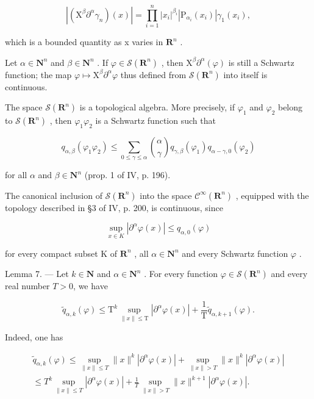\[
| (\mathrm{X} ^ {\beta} \partial^ {\alpha} \gamma_ {n}) (x) | = \prod_ {i = 1} ^ {n} | x _ {i} | ^ {\beta_ {i}} | \mathrm{P} _ {\alpha_ {i}} (x _ {i}) | \gamma_ {1} (x _ {i}),
\]

which is a bounded quantity as x varies in \(\mathbf{R}^{n}\) .

Let \(\alpha \in \mathbf{N}^n\) and \(\beta \in \mathbf{N}^n\) . If \(\varphi \in \mathcal{S}(\mathbf{R}^n)\) , then \(\mathrm{X}^{\beta}\partial^{\alpha}(\varphi)\) is still a Schwartz function; the map \(\varphi \mapsto \mathrm{X}^{\beta}\partial^{\alpha}\varphi\) thus defined from \(\mathcal{S}(\mathbf{R}^n)\) into itself is continuous.

The space \(\mathcal{S}(\mathbf{R}^{n})\) is a topological algebra. More precisely, if \(\varphi_{1}\) and \(\varphi_{2}\) belong to \(\mathcal{S}(\mathbf{R}^{n})\) , then \(\varphi_{1}\varphi_{2}\) is a Schwartz function such that

\[
q _ {\alpha , \beta} (\varphi_ {1} \varphi_ {2}) \leqslant \sum_ {0 \leqslant \gamma \leqslant \alpha} \binom{\alpha}{\gamma} q _ {\gamma , \beta} (\varphi_ {1}) q _ {\alpha - \gamma , 0} (\varphi_ {2})\tag{2}
\]

for all \(\alpha\) and \(\beta \in \mathbf{N}^n\) (prop. 1 of IV, p. 196).

The canonical inclusion of \(\mathcal{S}(\mathbf{R}^{n})\) into the space \(\mathcal{C}^{\infty}(\mathbf{R}^{n})\) , equipped with the topology described in §3 of IV, p. 200, is continuous, since

\[
\sup _ {x \in K} | \partial^ {\alpha} \varphi (x) | \leqslant q _ {\alpha , 0} (\varphi)
\]

for every compact subset K of \(\mathbf{R}^{n}\) , all \(\alpha \in \mathbf{N}^{n}\) and every Schwartz function \(\varphi\) .

Lemma 7. --- Let \(k \in \mathbf{N}\) and \(\alpha \in \mathbf{N}^n\) . For every function \(\varphi \in \mathcal{S}(\mathbf{R}^n)\) and every real number \(T > 0\), we have

\[
\widetilde {q} _ {\alpha , k} (\varphi) \leqslant \mathrm{T} ^ {k} \sup _ {\| x \| \leqslant \mathrm{T}} | \partial^ {\alpha} \varphi (x) | + \frac {1}{\mathrm{T}} \widetilde {q} _ {\alpha , k + 1} (\varphi).\tag{3}
\]

Indeed, one has

\[
\begin{array}{c} \widetilde {q} _ {\alpha , k} (\varphi) \leqslant \sup _ {\| x \| \leqslant T} \| x \| ^ {k} | \partial^ {\alpha} \varphi (x) | + \sup _ {\| x \| > T} \| x \| ^ {k} | \partial^ {\alpha} \varphi (x) | \\ \leqslant T ^ {k} \sup _ {\| x \| \leqslant T} | \partial^ {\alpha} \varphi (x) | + \frac {1}{T} \sup _ {\| x \| > T} \| x \| ^ {k + 1} | \partial^ {\alpha} \varphi (x) |. \end{array}
\]

